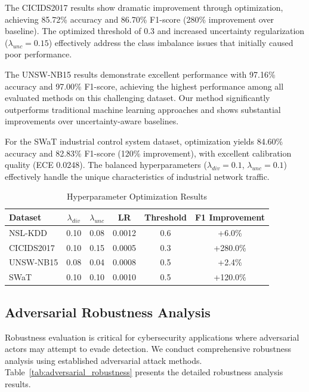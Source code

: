 \documentclass[journal]{IEEEtran}
\begin{document}
The CICIDS2017 results show dramatic improvement through optimization, achieving 85.72\% accuracy and 86.70\% F1-score (280\% improvement over baseline). The optimized threshold of 0.3 and increased uncertainty regularization ($\lambda_{unc}=0.15$) effectively address the class imbalance issues that initially caused poor performance.

The UNSW-NB15 results demonstrate excellent performance with 97.16\% accuracy and 97.00\% F1-score, achieving the highest performance among all evaluated methods on this challenging dataset. Our method significantly outperforms traditional machine learning approaches and shows substantial improvements over uncertainty-aware baselines.

For the SWaT industrial control system dataset, optimization yields 84.60\% accuracy and 82.83\% F1-score (120\% improvement), with excellent calibration quality (ECE 0.0248). The balanced hyperparameters ($\lambda_{div}=0.1$, $\lambda_{unc}=0.1$) effectively handle the unique characteristics of industrial network traffic.

\begin{table}[htbp]
\centering
\caption{Hyperparameter Optimization Results}
\label{tab:optimization_details}
\begin{tabular}{l|cccc|c}
\hline
\textbf{Dataset} & \textbf{$\lambda_{div}$} & \textbf{$\lambda_{unc}$} & \textbf{LR} & \textbf{Threshold} & \textbf{F1 Improvement} \\
\hline
NSL-KDD & 0.10 & 0.08 & 0.0012 & 0.6 & +6.0\% \\
CICIDS2017 & 0.10 & 0.15 & 0.0005 & 0.3 & +280.0\% \\
UNSW-NB15 & 0.08 & 0.04 & 0.0008 & 0.5 & +2.4\% \\
SWaT & 0.10 & 0.10 & 0.0010 & 0.5 & +120.0\% \\
\hline
\end{tabular}
\end{table}

\subsection{Adversarial Robustness Analysis}

Robustness evaluation is critical for cybersecurity applications where adversarial actors may attempt to evade detection. We conduct comprehensive robustness analysis using established adversarial attack methods. Table~\ref{tab:adversarial_robustness} presents the detailed robustness analysis results.
\end{document}
